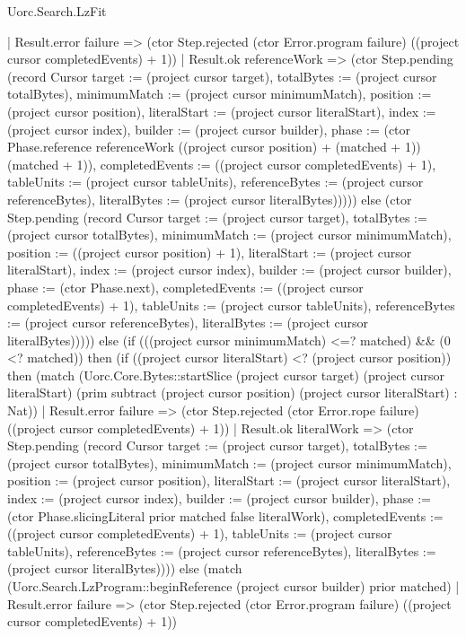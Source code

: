 \begin{lexlean}{Uorc.Search.LzFit}
\begin{semanticmodule}
{        | Result.error failure => (ctor Step.rejected (ctor Error.program failure) ((project cursor completedEvents) + 1))
        | Result.ok referenceWork => (ctor Step.pending (record Cursor {target := (project cursor target), totalBytes := (project cursor totalBytes), minimumMatch := (project cursor minimumMatch), position := (project cursor position), literalStart := (project cursor literalStart), index := (project cursor index), builder := (project cursor builder), phase := (ctor Phase.reference referenceWork ((project cursor position) + (matched + 1)) (matched + 1)), completedEvents := ((project cursor completedEvents) + 1), tableUnits := (project cursor tableUnits), referenceBytes := (project cursor referenceBytes), literalBytes := (project cursor literalBytes)})))) else (ctor Step.pending (record Cursor {target := (project cursor target), totalBytes := (project cursor totalBytes), minimumMatch := (project cursor minimumMatch), position := ((project cursor position) + 1), literalStart := (project cursor literalStart), index := (project cursor index), builder := (project cursor builder), phase := (ctor Phase.next), completedEvents := ((project cursor completedEvents) + 1), tableUnits := (project cursor tableUnits), referenceBytes := (project cursor referenceBytes), literalBytes := (project cursor literalBytes)})))) else (if (((project cursor minimumMatch) <=? matched) && (0 <? matched)) then (if ((project cursor literalStart) <? (project cursor position)) then (match (Uorc.Core.Bytes::startSlice (project cursor target) (project cursor literalStart) (prim subtract (project cursor position) (project cursor literalStart) : Nat))
        | Result.error failure => (ctor Step.rejected (ctor Error.rope failure) ((project cursor completedEvents) + 1))
        | Result.ok literalWork => (ctor Step.pending (record Cursor {target := (project cursor target), totalBytes := (project cursor totalBytes), minimumMatch := (project cursor minimumMatch), position := (project cursor position), literalStart := (project cursor literalStart), index := (project cursor index), builder := (project cursor builder), phase := (ctor Phase.slicingLiteral prior matched false literalWork), completedEvents := ((project cursor completedEvents) + 1), tableUnits := (project cursor tableUnits), referenceBytes := (project cursor referenceBytes), literalBytes := (project cursor literalBytes)}))) else (match (Uorc.Search.LzProgram::beginReference (project cursor builder) prior matched)
        | Result.error failure => (ctor Step.rejected (ctor Error.program failure) ((project cursor completedEvents) + 1))
}
\end{semanticmodule}
\end{lexlean}
